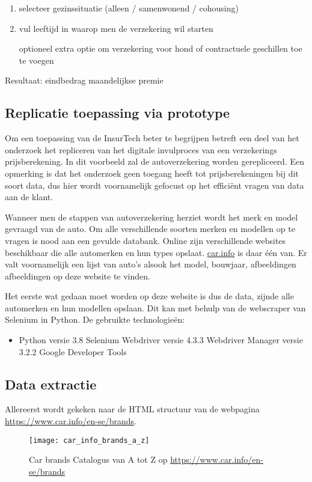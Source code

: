 \begin{enumerate}
	\item selecteer gezinssituatie (alleen / samenwonend / cohousing)
	\item vul leeftijd in waarop men de verzekering wil starten
	\item [optioneel] extra optie om verzekering voor hond of contractuele geschillen toe te voegen
\end{enumerate}
Resultaat: eindbedrag maandelijkse premie

\subsection{Replicatie toepassing via prototype}
Om een toepassing van de InsurTech beter te begrijpen betreft een deel van het onderzoek het repliceren van het digitale invulproces van een verzekerings prijsberekening.
In dit voorbeeld zal de autoverzekering worden gerepliceerd.
Een opmerking is dat het onderzoek geen toegang heeft tot prijsberekeningen bij dit soort data, dus hier wordt voornamelijk gefocust op het efficiënt vragen van data aan de klant.

Wanneer men de stappen van autoverzekering herziet wordt het merk en model gevraagd van de auto.
Om alle verschillende soorten merken en modellen op te vragen is nood aan een gevulde databank.
Online zijn verschillende websites beschikbaar die alle automerken en hun types opslaat.
\href{https://www.car.info/en-se/brands}{car.info} is daar één van.
Er valt voornamelijk een lijst van auto's alsook het model, bouwjaar, afbeeldingen afbeeldingen op deze website te vinden.

Het eerste wat gedaan moet worden op deze website is dus de data, zijnde alle automerken en hun modellen opslaan.
Dit kan met behulp van de webscraper van Selenium in Python.
De gebruikte technologieën:
\begin{itemize}
	\item Python versie 3.8
	\subitem Selenium Webdriver versie 4.3.3
	\subitem Webdriver Manager versie 3.2.2
	\subitem Google Developer Tools
\end{itemize}

\subsection{Data extractie}
Allereerst wordt gekeken naar de HTML structuur van de webpagina \url{https://www.car.info/en-se/brands}.

\begin{figure}[H]
	\centering
	\texttt{[image: car\_info\_brands\_a\_z]}
	\caption{Car brands Catalogus van A tot Z op \url{https://www.car.info/en-se/brands}}
\end{figure}

